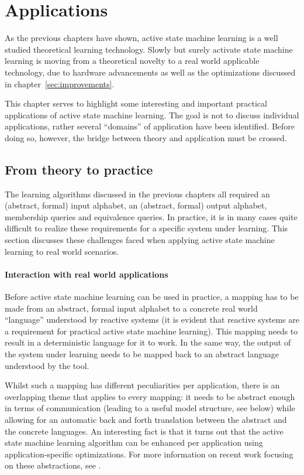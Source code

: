 \documentclass[multi,crop=false,class=article]{standalone}
\begin{document}
\section{Applications}
\label{sec:applications}

As the previous chapters have shown, active state machine learning is a well
studied theoretical learning technology. Slowly but surely activate state
machine learning is moving from a theoretical novelty to a real world applicable
technology, due to hardware advancements as well as the optimizations discussed
in chapter~\ref{sec:improvements}.

This chapter serves to highlight some interesting and important practical
applications of active state machine learning. The goal is not to discuss
individual applications, rather several ``domains'' of application have been
identified. Before doing so, however, the bridge between theory and application
must be crossed.

\subsection{From theory to practice}
\label{sec:theory-to-practice}

The learning algorithms discussed in the previous chapters all required an
(abstract, formal) input alphabet, an (abstract, formal) output alphabet,
membership queries and equivalence queries. In practice, it is in many cases
quite difficult to realize these requirements for a specific system under
learning\cite{Stefen11a}. This section discusses these challenges faced when
applying active state machine learning to real world scenarios.

\paragraph{Interaction with real world applications} Before active state machine
learning can be used in practice, a mapping has to be made from an abstract,
formal input alphabet to a concrete real world ``language'' understood by
reactive systems (it is evident that reactive systems are a requirement for
practical active state machine learning). This mapping needs to result in a deterministic language for it to
work\cite{Steffen11a}. In the same way, the output of the system under learning
needs to be mapped back to an abstract language understood by the
tool.

Whilst such a mapping has different peculiarities per application, there is an
overlapping theme that applies to every mapping: it needs to be abstract enough
in terms of communication (leading to a useful model structure, see below) while
allowing for an automatic back and forth translation between the abstract and
the concrete languages\cite{Steffen11a}. An interesting fact is that it turns
out that the active state machine learning algorithm can be enhanced per
application using application-specific optimizations\cite{Hungar03}. For more
information on recent work focusing on these abstractions, see
\cite{Aarts10,Howar11,Jonsson11}.
\end{document}
